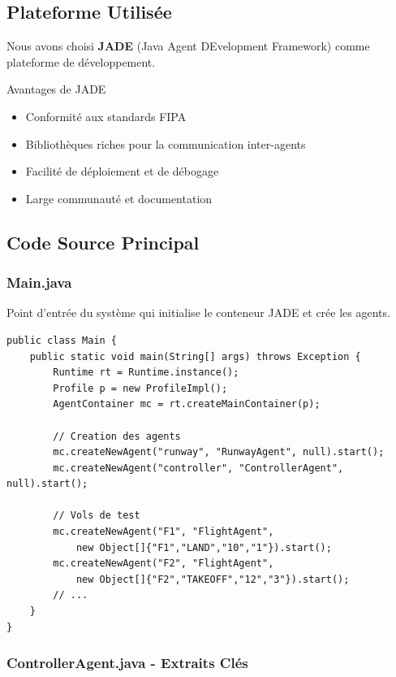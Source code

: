 \documentclass[12pt,a4paper]{article}
\begin{document}
\subsection{Plateforme Utilisée}

Nous avons choisi \textbf{JADE} (Java Agent DEvelopment Framework) comme plateforme de développement.

\begin{infobox}{Avantages de JADE}
\begin{itemize}[leftmargin=*]
    \item Conformité aux standards FIPA
    \item Bibliothèques riches pour la communication inter-agents
    \item Facilité de déploiement et de débogage
    \item Large communauté et documentation
\end{itemize}
\end{infobox}

\subsection{Code Source Principal}

\subsubsection{Main.java}

Point d'entrée du système qui initialise le conteneur JADE et crée les agents.

\begin{lstlisting}[caption=Main.java - Initialisation du système]
public class Main {
    public static void main(String[] args) throws Exception {
        Runtime rt = Runtime.instance();
        Profile p = new ProfileImpl();
        AgentContainer mc = rt.createMainContainer(p);

        // Creation des agents
        mc.createNewAgent("runway", "RunwayAgent", null).start();
        mc.createNewAgent("controller", "ControllerAgent", null).start();

        // Vols de test
        mc.createNewAgent("F1", "FlightAgent",
            new Object[]{"F1","LAND","10","1"}).start();
        mc.createNewAgent("F2", "FlightAgent",
            new Object[]{"F2","TAKEOFF","12","3"}).start();
        // ...
    }
}
\end{lstlisting}

\subsubsection{ControllerAgent.java - Extraits Clés}
\end{document}
